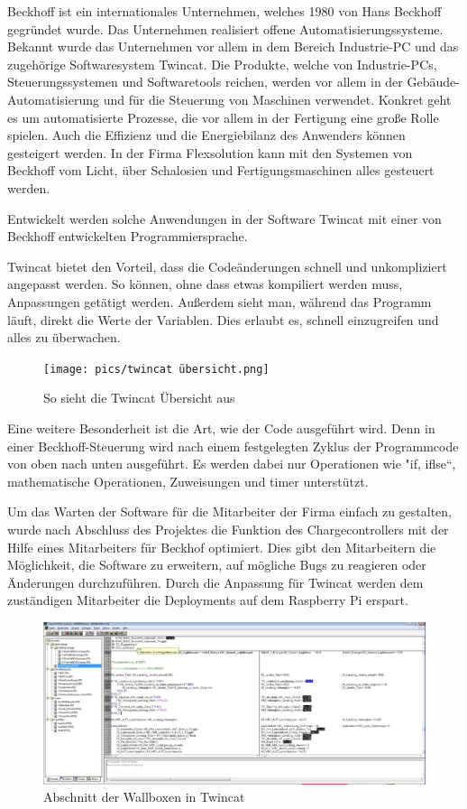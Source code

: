  

Beckhoff ist ein internationales Unternehmen, welches 1980 von Hans Beckhoff gegründet wurde. Das Unternehmen realisiert offene Automatisierungssysteme. Bekannt wurde das Unternehmen vor allem in dem Bereich Industrie-PC und das zugehörige Softwaresystem Twincat. Die Produkte, welche von Industrie-PCs, Steuerungssystemen und Softwaretools reichen, werden vor allem in der Gebäude-Automatisierung und für die Steuerung von Maschinen verwendet. Konkret geht es um automatisierte Prozesse, die vor allem in der Fertigung eine große Rolle spielen. Auch die Effizienz und die Energiebilanz des Anwenders können gesteigert werden. In der Firma Flexsolution kann mit den Systemen von Beckhoff vom Licht, über Schalosien und Fertigungsmaschinen alles gesteuert werden.   

Entwickelt werden solche Anwendungen in der Software Twincat mit einer von Beckhoff entwickelten Programmiersprache.   

  

Twincat bietet den Vorteil, dass die Codeänderungen schnell und unkompliziert angepasst werden. So können, ohne dass etwas kompiliert werden muss, Anpassungen getätigt werden. Außerdem sieht man, während das Programm läuft, direkt die Werte der Variablen. Dies erlaubt es, schnell einzugreifen und alles zu überwachen.

\begin{figure}[h t]
    \centering
    \texttt{[image: pics/twincat übersicht.png]}
    \caption{So sieht die Twincat Übersicht aus}
    \label{fig:impl:TwincatÜbersicht}
  \end{figure}

  Eine weitere Besonderheit ist die Art, wie der Code ausgeführt wird. Denn in einer Beckhoff-Steuerung wird nach einem festgelegten Zyklus der Programmcode von oben nach unten ausgeführt. Es werden dabei nur Operationen wie "if, iflse“, mathematische Operationen, Zuweisungen und timer unterstützt.   

Um das Warten der Software für die Mitarbeiter der Firma einfach zu gestalten, wurde nach Abschluss des Projektes die Funktion des Chargecontrollers mit der Hilfe eines Mitarbeiters für Beckhof optimiert. Dies gibt den Mitarbeitern die Möglichkeit, die Software zu erweitern, auf mögliche Bugs zu reagieren oder Änderungen durchzuführen. Durch die Anpassung für Twincat werden dem zuständigen Mitarbeiter die Deployments auf dem Raspberry Pi erspart.   

\begin{figure}[h t]
    \centering
    \includegraphics[scale=0.2]{pics/LadestationTwincat.png}
    \caption{Abschnitt der Wallboxen in Twincat}
    \label{fig:impl:TwincatWallbox}
  \end{figure}